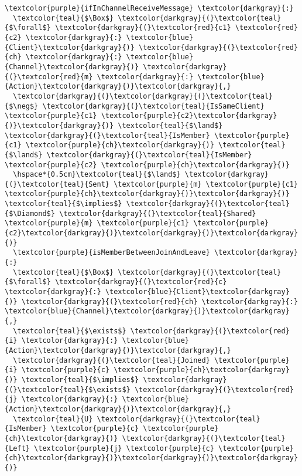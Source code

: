 \begin{Verbatim}[commandchars=\\\{\},codes={\catcode`$=3}]
  \textcolor{purple}{ifInChannelReceiveMessage} \textcolor{darkgray}{:}
  \textcolor{teal}{$\Box$} \textcolor{darkgray}{(}\textcolor{teal}{$\forall$} \textcolor{darkgray}{(}\textcolor{red}{c1} \textcolor{red}{c2} \textcolor{darkgray}{:} \textcolor{blue}{Client}\textcolor{darkgray}{)} \textcolor{darkgray}{(}\textcolor{red}{ch} \textcolor{darkgray}{:} \textcolor{blue}{Channel}\textcolor{darkgray}{)} \textcolor{darkgray}{(}\textcolor{red}{m} \textcolor{darkgray}{:} \textcolor{blue}{Action}\textcolor{darkgray}{)}\textcolor{darkgray}{,}
  \textcolor{darkgray}{(}\textcolor{darkgray}{(}\textcolor{teal}{$\neg$} \textcolor{darkgray}{(}\textcolor{teal}{IsSameClient} \textcolor{purple}{c1} \textcolor{purple}{c2}\textcolor{darkgray}{)}\textcolor{darkgray}{)} \textcolor{teal}{$\land$} \textcolor{darkgray}{(}\textcolor{teal}{IsMember} \textcolor{purple}{c1} \textcolor{purple}{ch}\textcolor{darkgray}{)} \textcolor{teal}{$\land$} \textcolor{darkgray}{(}\textcolor{teal}{IsMember} \textcolor{purple}{c2} \textcolor{purple}{ch}\textcolor{darkgray}{)}
  \hspace*{0.5cm}\textcolor{teal}{$\land$} \textcolor{darkgray}{(}\textcolor{teal}{Sent} \textcolor{purple}{m} \textcolor{purple}{c1} \textcolor{purple}{ch}\textcolor{darkgray}{)}\textcolor{darkgray}{)} \textcolor{teal}{$\implies$} \textcolor{darkgray}{(}\textcolor{teal}{$\Diamond$} \textcolor{darkgray}{(}\textcolor{teal}{Shared} \textcolor{purple}{m} \textcolor{purple}{c1} \textcolor{purple}{c2}\textcolor{darkgray}{)}\textcolor{darkgray}{)}\textcolor{darkgray}{)}
  \textcolor{purple}{isMemberBetweenJoinAndLeave} \textcolor{darkgray}{:}
  \textcolor{teal}{$\Box$} \textcolor{darkgray}{(}\textcolor{teal}{$\forall$} \textcolor{darkgray}{(}\textcolor{red}{c} \textcolor{darkgray}{:} \textcolor{blue}{Client}\textcolor{darkgray}{)} \textcolor{darkgray}{(}\textcolor{red}{ch} \textcolor{darkgray}{:} \textcolor{blue}{Channel}\textcolor{darkgray}{)}\textcolor{darkgray}{,}
  \textcolor{teal}{$\exists$} \textcolor{darkgray}{(}\textcolor{red}{i} \textcolor{darkgray}{:} \textcolor{blue}{Action}\textcolor{darkgray}{)}\textcolor{darkgray}{,}
  \textcolor{darkgray}{(}\textcolor{teal}{Joined} \textcolor{purple}{i} \textcolor{purple}{c} \textcolor{purple}{ch}\textcolor{darkgray}{)} \textcolor{teal}{$\implies$} \textcolor{darkgray}{(}\textcolor{teal}{$\exists$} \textcolor{darkgray}{(}\textcolor{red}{j} \textcolor{darkgray}{:} \textcolor{blue}{Action}\textcolor{darkgray}{)}\textcolor{darkgray}{,}
  \textcolor{teal}{U} \textcolor{darkgray}{(}\textcolor{teal}{IsMember} \textcolor{purple}{c} \textcolor{purple}{ch}\textcolor{darkgray}{)} \textcolor{darkgray}{(}\textcolor{teal}{Left} \textcolor{purple}{j} \textcolor{purple}{c} \textcolor{purple}{ch}\textcolor{darkgray}{)}\textcolor{darkgray}{)}\textcolor{darkgray}{)}

\end{Verbatim}
